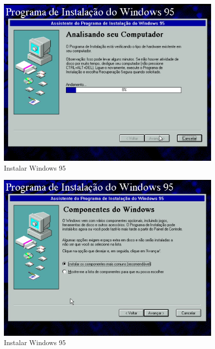 \documentclass{report}
\begin{document}
\begin{figure}
\centering
\includegraphics[width=\textwidth]{Screenshot_38.png}
\caption{Instalar Windows 95}
\label{fig:38}
\end{figure}

\begin{figure}
\centering
\includegraphics[width=\textwidth]{Screenshot_39.png}
\caption{Instalar Windows 95}
\label{fig:39}
\end{figure}
\end{document}
